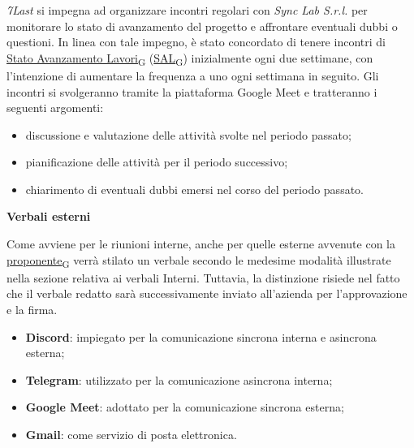 \textit{7Last} si impegna ad organizzare incontri regolari con \textit{Sync Lab S.r.l.} per monitorare lo stato di avanzamento del progetto e affrontare eventuali dubbi o questioni. In linea con tale impegno, è stato concordato di tenere incontri di \href{https://7last.github.io/docs/pb/documentazione-interna/glossario\#stato-avanzamento-lavori}{Stato Avanzamento Lavori\textsubscript{G}} (\href{https://7last.github.io/docs/pb/documentazione-interna/glossario\#stato-avanzamento-lavori}{SAL\textsubscript{G}}) inizialmente ogni due settimane, con l'intenzione di aumentare la frequenza a uno ogni settimana in seguito. Gli incontri si svolgeranno tramite la piattaforma Google Meet e tratteranno i seguenti argomenti:
\begin{itemize}
    \item discussione e valutazione delle attività svolte nel periodo passato;
    \item pianificazione delle attività per il periodo successivo;
    \item chiarimento di eventuali dubbi emersi nel corso del periodo passato.
\end{itemize}
\begin{flushleft}
\textbf{Verbali esterni}
\end{flushleft}
Come avviene per le riunioni interne, anche per quelle esterne avvenute con la \href{https://7last.github.io/docs/pb/documentazione-interna/glossario\#proponente}{proponente\textsubscript{G}} verrà stilato un verbale secondo le medesime modalità illustrate nella sezione relativa ai verbali Interni. Tuttavia, la distinzione risiede nel fatto che il verbale redatto sarà successivamente inviato all'azienda per l'approvazione e la firma.

\begin{itemize}
    \item \textbf{Discord}: impiegato per la comunicazione sincrona interna e asincrona esterna;
    \item \textbf{Telegram}: utilizzato per la comunicazione asincrona interna;
    \item \textbf{Google Meet}: adottato per la comunicazione sincrona esterna;
    \item \textbf{Gmail}: come servizio di posta elettronica.
\end{itemize}

